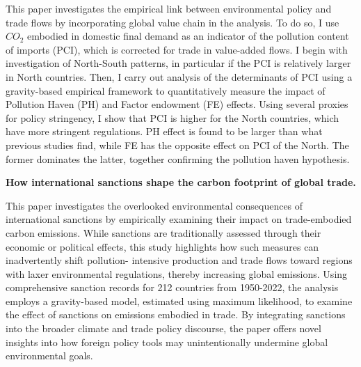 This paper investigates the empirical link between environmental policy and trade flows by incorporating global value chain in the analysis. To do so, I use $CO_{2}$ embodied in domestic final demand as an indicator of the pollution content of imports (PCI), which is corrected for trade in value-added flows. I begin with investigation of North-South patterns, in particular if the PCI is relatively larger in North countries. Then, I carry out analysis of the determinants of PCI using a gravity-based empirical framework to quantitatively measure the impact of Pollution Haven (PH) and Factor endowment (FE) effects. Using several proxies for policy stringency, I show that PCI is higher for the North countries, which have more stringent regulations.  PH effect is found to be larger than what previous studies find, while FE has the opposite effect on PCI of the North. The former dominates the latter, together confirming the pollution haven hypothesis.

\vspace{1em}
\textbf{How international sanctions shape the carbon footprint of global trade.}
\vspace{1em}

This paper investigates the overlooked environmental consequences of international sanctions by empirically examining their impact on trade-embodied carbon emissions. While sanctions are traditionally assessed through their economic or political effects, this study highlights how such measures can inadvertently shift pollution- intensive production and trade flows toward regions with laxer environmental regulations, thereby increasing global emissions. Using comprehensive sanction records for 212 countries from 1950-2022, the analysis employs a gravity-based model, estimated using maximum likelihood, to examine the effect of sanctions on emissions embodied in trade. By integrating sanctions into the broader climate and trade policy discourse, the paper offers novel insights into how foreign policy tools may unintentionally undermine global environmental goals.




